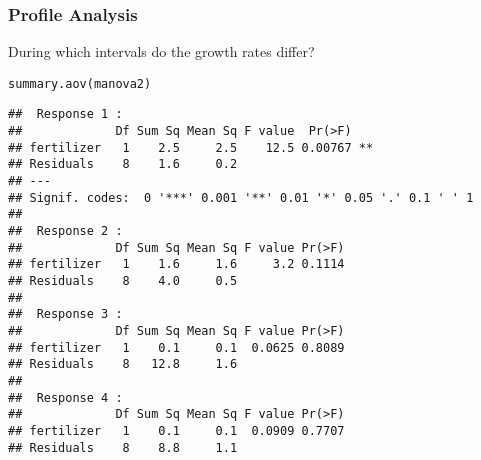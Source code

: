 \documentclass[color=usenames,dvipsnames]{beamer}\usepackage[]{graphicx}\usepackage[]{color}
\makeatletter
\newcommand{\hlstd}[1]{\textcolor[rgb]{0,0,0}{#1}}%
\newcommand{\hlkwd}[1]{\textcolor[rgb]{0.004,0.004,0.506}{#1}}%
\newenvironment{kframe}{%
 \def\at@end@of@kframe{}%
 \ifinner\ifhmode%
  \def\at@end@of@kframe{\end{minipage}}%
  \begin{minipage}{\columnwidth}%
 \fi\fi%
 \def\FrameCommand##1{\hskip\@totalleftmargin \hskip-\fboxsep
 \colorbox{shadecolor}{##1}\hskip-\fboxsep
     \hskip-\linewidth \hskip-\@totalleftmargin \hskip\columnwidth}%
 \MakeFramed {\advance\hsize-\width
   \@totalleftmargin\z@ \linewidth\hsize
   \@setminipage}}%
 {\par\unskip\endMakeFramed%
 \at@end@of@kframe}
\newenvironment{knitrout}{}{} %
\makeatother
\begin{document}
\begin{frame}[fragile]
  \frametitle{Profile Analysis}
  \footnotesize
  {%
    During which intervals do the growth rates differ?}
  \pause
  \scriptsize %
\begin{knitrout}\scriptsize
{}\color{fgcolor}\begin{kframe}
\begin{alltt}
\hlkwd{summary.aov}\hlstd{(manova2)}
\end{alltt}
\begin{verbatim}
##  Response 1 :
##             Df Sum Sq Mean Sq F value  Pr(>F)   
## fertilizer   1    2.5     2.5    12.5 0.00767 **
## Residuals    8    1.6     0.2                   
## ---
## Signif. codes:  0 '***' 0.001 '**' 0.01 '*' 0.05 '.' 0.1 ' ' 1
## 
##  Response 2 :
##             Df Sum Sq Mean Sq F value Pr(>F)
## fertilizer   1    1.6     1.6     3.2 0.1114
## Residuals    8    4.0     0.5               
## 
##  Response 3 :
##             Df Sum Sq Mean Sq F value Pr(>F)
## fertilizer   1    0.1     0.1  0.0625 0.8089
## Residuals    8   12.8     1.6               
## 
##  Response 4 :
##             Df Sum Sq Mean Sq F value Pr(>F)
## fertilizer   1    0.1     0.1  0.0909 0.7707
## Residuals    8    8.8     1.1
\end{verbatim}
\end{kframe}
\end{knitrout}
\end{frame}
\end{document}
